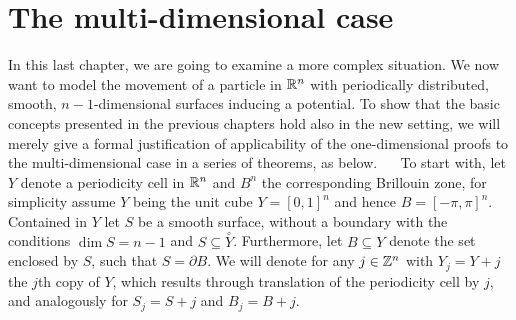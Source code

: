 \chapter{The multi-dimensional case} \label{chap5}

In this last chapter, we are going to examine a more complex situation. We now want to model the movement of a particle in $\mathbb{R}^{n}$ with periodically distributed, smooth, $n-1$-dimensional surfaces inducing a potential. To show that the basic concepts presented in the previous chapters hold also in the new setting, we will merely give a formal justification of applicability of the one-dimensional proofs to the multi-dimensional case in a series of theorems, as below.
~\newline ~\newline
To start with, let $Y$ denote a periodicity cell in $\mathbb{R}^{n}$ and $B^{n}$ the corresponding Brillouin zone, for simplicity assume $Y$ being the unit cube $Y = [0, 1]^{n}$ and hence $B = [-\pi, \pi]^{n}$. Contained in $Y$ let $S$ be a smooth surface, without a boundary with the conditions $\dim S = n - 1$ and $S \subseteq \overset{\circ}{Y}$. Furthermore, let $B \subseteq Y$ denote the set enclosed by $S$, such that $S = \partial B$. We will denote for any $j \in \mathbb{Z}^{n}$ with $Y_{j} = Y + j$ the $j$th copy of $Y$, which results through translation of the periodicity cell by $j$, and analogously for $S_{j} = S + j$ and $B_{j} = B + j$. %

